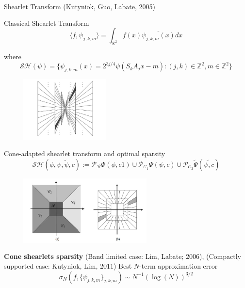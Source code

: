 \begin{frame}{Shearlet Transform (Kutyniok, Guo, Labate, 2005)}
\begin{block}{Classical Shearlet Transform}
$$
\langle f,\psi_{j,k,m}\rangle =\int_{\mathbb{R}^2}f(x)\overline{\psi_{j,k,m}(x)}dx
$$

where
$$
\mathcal{SH}(\psi)=\{\psi_{j,k,m}(x)=2^{3j/4}\psi (S_kA_jx-m):(j,k)\in\mathbb{Z}^2,m\in\mathbb{Z}^2\}
$$
\end{block}

\begin{figure}[h!]
\centering
\includegraphics[width=0.4\textwidth]{./Images/tiling_nocone.jpg}
\end{figure}
\end{frame}

\begin{frame}{Cone-adapted shearlet transform and optimal sparsity}
$$
\mathcal{SH}(\phi,\psi,\tilde{\psi},c):=\mathcal{P}_{\mathcal{R}}\Phi(\phi,c1)\cup\mathcal{P}_{\mathcal{C}_1}\Psi(\psi,c)\cup\mathcal{P}_{\mathcal{C}_2}\tilde{\Psi}(\tilde{\psi,c})
$$

\begin{figure}[h!]
\centering
\includegraphics[width=0.6\textwidth]{./Images/tiling_cone}
\end{figure}

\pause
\begin{block}{\textbf{Cone shearlets sparsity} (Band limited case: Lim, Labate; 2006), (Compactly supported case: Kutyniok, Lim, 2011)}
Best $N$-term approximation error
$$
\sigma_N(f,\{\psi_{j,k,m}\}_{j,k,m})\sim N^{-1}(\log(N))^{3/2}
$$
\end{block}
\end{frame}


